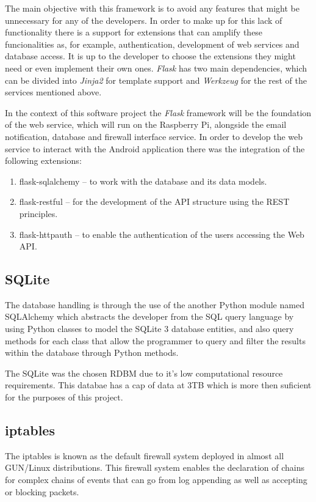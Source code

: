 The main objective with this framework is to avoid any features that might be
unnecessary for any of the developers. In order to make up for this lack of
functionality there is a support for extensions that can amplify these
funcionalities as, for example, authentication, development of web services and
database access. It is up to the developer to choose the extensions they might
need or even implement their own ones.
\emph{Flask} has two main dependencies, which can be divided into \emph{Jinja2} for
template support and \emph{Werkzeug} for the rest of the services mentioned
above.

In the context of this software project the \emph{Flask} framework will be the
foundation of the web service, which will run on the Raspberry Pi, alongside the
email notification, database and firewall interface service. In order to develop
the web service to interact with the Android application there was the
integration of the following extensions:
\begin{enumerate}
	\item flask-sqlalchemy -- to work with the database and its data models.
	\item flask-restful -- for the development of the API structure using the
		REST principles.
	\item flask-httpauth -- to enable the authentication of the users accessing
		the Web API.
\end{enumerate}

\subsection{SQLite}
\label{chap3:sec:tools:sub:sqlite}
The database handling is through the use of the another Python module named
SQLAlchemy which abstracts the developer from the SQL query language by using
Python classes to model the SQLite 3 database entities, and also query methods
for each class that allow the programmer to query and filter the results within
the database through Python methods.

The SQLite was the chosen RDBM due to it's low computational resource
requirements. This databae has a cap of data at 3TB which is more then suficient
for the purposes of this project.

\subsection{iptables}
\label{chap3:sec:tools:sub:iptables}
The iptables is known as the default firewall system deployed in almost all
GUN/Linux distributions. This firewall system enables the declaration of chains
for complex chains of events that can go from log appending as well as accepting
or blocking packets.

